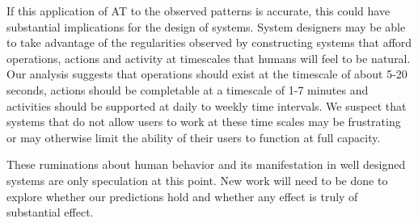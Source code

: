 If this application of AT to the observed patterns is accurate, this could have substantial implications for the design of systems.  System designers may be able to take advantage of the regularities observed by constructing systems that afford operations, actions and activity at timescales that humans will feel to be natural.  Our analysis suggests that operations should exist at the timescale of about 5-20 seconds, actions should be completable at a timescale of 1-7 minutes and activities should be supported at daily to weekly time intervals.  We suspect that systems that do not allow users to work at these time scales may be frustrating or may otherwise limit the ability of their users to function at full capacity.

These ruminations about human behavior and its manifestation in well designed systems are only speculation at this point.  New work will need to be done to explore whether our predictions hold and whether any effect is truly of substantial effect.
